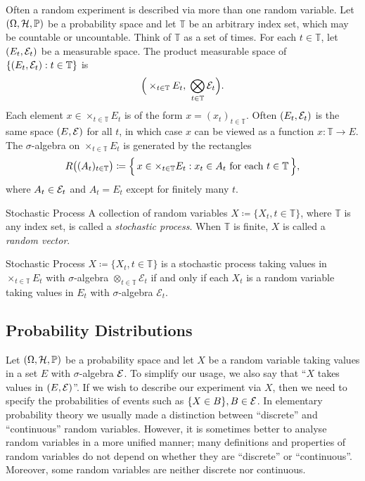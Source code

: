 Often a random experiment is described via more than one random variable. Let $(\Omega,\mathcal{H},\mathbb{P})$ be a probability space and let $\mathbb{T}$ be an arbitrary index set, which may be countable or uncountable. Think of $\mathbb{T}$ as a set of times. For each $t \in \mathbb{T}$, let $(E_t,\mathcal{E}_t)$ be a measurable space. The product measurable space of $\{(E_t,\mathcal{E}_t): t \in \mathbb{T}\}$ is
\[
	\Big(\times_{t \in \mathbb{T}} E_t,\;\bigotimes_{t \in \mathbb{T}} \mathcal{E}_t\Big).
\]
Each element $x \in \times_{t \in \mathbb{T}} E_t$ is of the form $x = (x_t)_{t \in \mathbb{T}}$. Often $(E_t,\mathcal{E}_t)$ is the same space $(E,\mathcal{E})$ for all $t$, in which case $x$ can be viewed as a function $x:\mathbb{T} \to E$. The $\sigma$-algebra on $\times_{t \in \mathbb{T}} E_t$ is generated by the rectangles
\begin{equation}
	R\big((A_t)_{t \in \mathbb{T}}\big) \coloneqq \Big\{\,x \in \times_{t \in \mathbb{T}} E_t : x_t \in A_t \text{ for each } t \in \mathbb{T}\,\Big\},
	\label{eq:ProductRectangles}
\end{equation}
where $A_t \in \mathcal{E}_t$ and $A_t = E_t$ except for finitely many $t$.

\begin{defn}{Stochastic Process}{}
	A collection of random variables $X \coloneqq \{X_t, t \in \mathbb{T}\}$, where $\mathbb{T}$ is any index set, is called a \textit{stochastic process}. When $\mathbb{T}$ is finite, $X$ is called a \textit{random vector}.
\end{defn}

\begin{thm}{Stochastic Process}{}
	$X \coloneqq \{X_t, t \in \mathbb{T}\}$ is a stochastic process taking values in $\times_{t \in \mathbb{T}} E_t$ with $\sigma$-algebra $\otimes_{t \in \mathbb{T}} \mathcal{E}_t$ if and only if each $X_t$ is a random variable taking values in $E_t$ with $\sigma$-algebra $\mathcal{E}_t$.
\end{thm}

\subsection{Probability Distributions}
Let $(\Omega, \mathcal{H}, \mathbb{P})$ be a probability space and let $X$ be a random variable taking values
in a set $E$ with $\sigma$-algebra $\mathcal{E}$. To simplify our usage, we also say that ``$X$ takes values
in $(E, \mathcal{E})$''. If we wish to describe our experiment via $X$, then we need to specify
the probabilities of events such as $\{X \in B\}, B \in \mathcal{E}$. In elementary probability
theory we usually made a distinction between ``discrete'' and ``continuous'' random
variables. However, it is sometimes better to analyse random variables in a more
unified manner; many definitions and properties of random variables do not depend
on whether they are ``discrete'' or ``continuous''. Moreover, some random variables
are neither discrete nor continuous.

